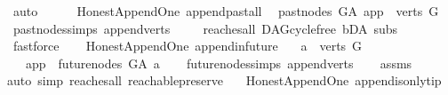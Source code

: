 \begin{isabellebody}
\ auto\ \isanewline
\ \ \isamarkupfalse%
\isanewline
{}\isamarkupfalse%
%
\endisatagproof
{\isafoldproof}%
%
\isadelimproof
\isanewline
%
\endisadelimproof
\isanewline
{}\isamarkupfalse%
\ {\isacharparenleft}{\kern0pt}\ Honest{\isacharunderscore}{\kern0pt}Append{\isacharunderscore}{\kern0pt}One{\isacharparenright}{\kern0pt}\ append{\isacharunderscore}{\kern0pt}past{\isacharunderscore}{\kern0pt}all{\isacharcolon}{\kern0pt}\isanewline
\ \ {\isachardoublequoteopen}past{\isacharunderscore}{\kern0pt}nodes\ G{\isacharunderscore}{\kern0pt}A\ app\ {\isacharequal}{\kern0pt}\ verts\ G{\isachardoublequoteclose}\isanewline
%
\isadelimproof
\ \ %
\endisadelimproof
%
\isatagproof
{}\isamarkupfalse%
\ past{\isacharunderscore}{\kern0pt}nodes{\isachardot}{\kern0pt}simps\ append{\isacharunderscore}{\kern0pt}verts\ \isanewline
\ \ \isamarkupfalse%
\ reaches{\isacharunderscore}{\kern0pt}all\ DAG{\isachardot}{\kern0pt}cycle{\isacharunderscore}{\kern0pt}free\ bD{\isacharunderscore}{\kern0pt}A\ subs\isanewline
\ \ \isamarkupfalse%
\ fastforce%
\endisatagproof
{\isafoldproof}%
%
\isadelimproof
\ \isanewline
%
\endisadelimproof
\isanewline
\isanewline
\isanewline
{}\isamarkupfalse%
\ {\isacharparenleft}{\kern0pt}\ Honest{\isacharunderscore}{\kern0pt}Append{\isacharunderscore}{\kern0pt}One{\isacharparenright}{\kern0pt}\ append{\isacharunderscore}{\kern0pt}in{\isacharunderscore}{\kern0pt}future{\isacharcolon}{\kern0pt}\isanewline
\ \ \ {\isachardoublequoteopen}a\ {\isasymin}\ verts\ G{\isachardoublequoteclose}\isanewline
\ \ \ {\isachardoublequoteopen}app\ {\isasymin}\ future{\isacharunderscore}{\kern0pt}nodes\ G{\isacharunderscore}{\kern0pt}A\ a{\isachardoublequoteclose}\isanewline
%
\isadelimproof
\ \ %
\endisadelimproof
%
\isatagproof
{}\isamarkupfalse%
\ future{\isacharunderscore}{\kern0pt}nodes{\isachardot}{\kern0pt}simps\ append{\isacharunderscore}{\kern0pt}verts\isanewline
\ \ \isamarkupfalse%
\ assms\isanewline
{}\isamarkupfalse%
{\isacharparenleft}{\kern0pt}auto\ simp{\isacharcolon}{\kern0pt}\ reaches{\isacharunderscore}{\kern0pt}all\ reachable{}{\isacharunderscore}{\kern0pt}preserve{\isacharparenright}{\kern0pt}\ \isamarkupfalse%
%
\endisatagproof
{\isafoldproof}%
%
\isadelimproof
\isanewline
%
\endisadelimproof
\isanewline
{}\isamarkupfalse%
\ {\isacharparenleft}{\kern0pt}\ Honest{\isacharunderscore}{\kern0pt}Append{\isacharunderscore}{\kern0pt}One{\isacharparenright}{\kern0pt}\ append{\isacharunderscore}{\kern0pt}is{\isacharunderscore}{\kern0pt}only{\isacharunderscore}{\kern0pt}tip{\isacharcolon}{\kern0pt}\isanewline

\end{isabellebody}
